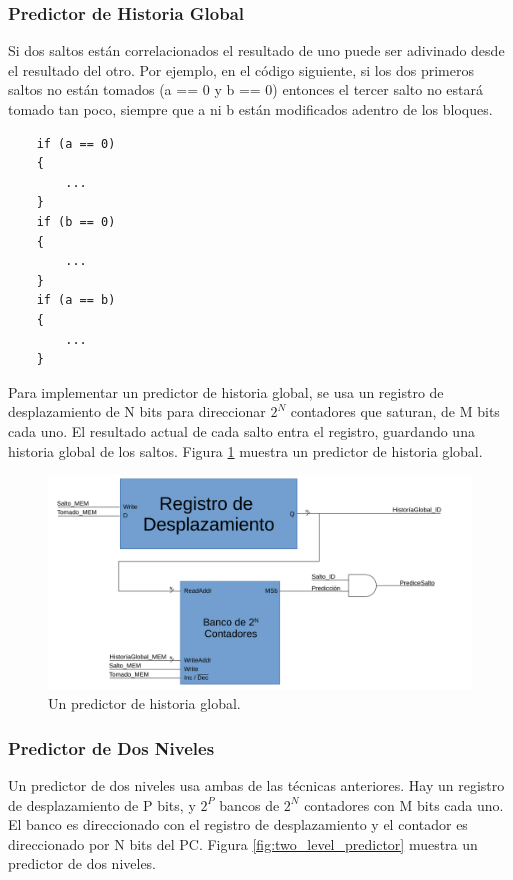 \documentclass[a4paper]{article}
\begin{document}
\subsubsection{Predictor de Historia Global}

Si dos saltos están correlacionados el resultado de uno puede ser adivinado desde el resultado del otro. Por ejemplo, en el código siguiente, si los dos primeros saltos no están tomados (a == 0 y b == 0) entonces el tercer salto no estará tomado tan poco, siempre que a ni b están modificados adentro de los bloques.

\begin{verbatim}
    if (a == 0)
    {
        ...
    }
    if (b == 0)
    {
        ...
    }
    if (a == b)
    {
        ...
    }
\end{verbatim}

Para implementar un predictor de historia global, se usa un registro de desplazamiento de N bits para direccionar $2^N$ contadores que saturan, de M bits cada uno. El resultado actual de cada salto entra el registro, guardando una historia global de los saltos. Figura \ref{fig:global_history} muestra un predictor de historia global.

\begin{figure}[!htb]
\centering
\includegraphics[scale=0.4]{./img/global_history}
\caption{Un predictor de historia global.}
\label{fig:global_history}
\end{figure}

\subsubsection{Predictor de Dos Niveles}

Un predictor de dos niveles usa ambas de las técnicas anteriores. Hay un registro de desplazamiento de P bits, y $2^P$ bancos de $2^N$ contadores con M bits cada uno. El banco es direccionado con el registro de desplazamiento y el contador es direccionado por N bits del PC. Figura \ref{fig:two_level_predictor} muestra un predictor de dos niveles.
\end{document}
